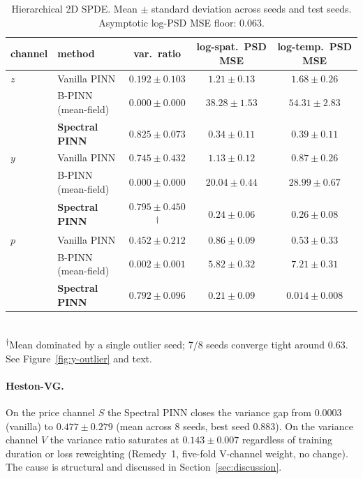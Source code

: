 \documentclass[review,12pt]{elsarticle}
\begin{document}
\begin{table}[h]
\centering
\caption{Hierarchical 2D SPDE. Mean \(\pm\) standard deviation
across seeds and test seeds. Asymptotic log-PSD MSE floor: 0.063.}
\label{tab:hier}
\begin{tabular}{l l c c c}
\toprule
channel & method & var.\ ratio & log-spat.\ PSD MSE & log-temp.\ PSD MSE \\
\midrule
\(z\) & Vanilla PINN          & \(0.192 \pm 0.103\) & \(1.21 \pm 0.13\) & \(1.68 \pm 0.26\) \\
      & B-PINN (mean-field)   & \(0.000 \pm 0.000\) & \(38.28 \pm 1.53\) & \(54.31 \pm 2.83\) \\
      & \textbf{Spectral PINN} & \(\mathbf{0.825 \pm 0.073}\) & \(\mathbf{0.34 \pm 0.11}\) & \(\mathbf{0.39 \pm 0.11}\) \\
\midrule
\(y\) & Vanilla PINN          & \(0.745 \pm 0.432\) & \(1.13 \pm 0.12\) & \(0.87 \pm 0.26\) \\
      & B-PINN (mean-field)   & \(0.000 \pm 0.000\) & \(20.04 \pm 0.44\) & \(28.99 \pm 0.67\) \\
      & \textbf{Spectral PINN} & \(0.795 \pm 0.450\)\textsuperscript{$\dagger$}
                                & \(\mathbf{0.24 \pm 0.06}\)
                                & \(\mathbf{0.26 \pm 0.08}\) \\
\midrule
\(p\) & Vanilla PINN          & \(0.452 \pm 0.212\) & \(0.86 \pm 0.09\) & \(0.53 \pm 0.33\) \\
      & B-PINN (mean-field)   & \(0.002 \pm 0.001\) & \(5.82 \pm 0.32\) & \(7.21 \pm 0.31\) \\
      & \textbf{Spectral PINN} & \(\mathbf{0.792 \pm 0.096}\)
                                & \(\mathbf{0.21 \pm 0.09}\)
                                & \(\mathbf{0.014 \pm 0.008}\) \\
\bottomrule
\end{tabular}\\[4pt]
\textsuperscript{$\dagger$}Mean dominated by a single outlier
seed; 7/8 seeds converge tight around $0.63$. See
Figure~\ref{fig:y-outlier} and text.
\end{table}

\paragraph{Heston-VG.}
On the price channel \(S\) the Spectral PINN closes the variance
gap from \(0.0003\) (vanilla) to \(0.477 \pm 0.279\) (mean across
8 seeds, best seed 0.883). On the variance channel \(V\) the
variance ratio saturates at \(0.143 \pm 0.007\) regardless of
training duration or loss reweighting (Remedy~1, five-fold
V-channel weight, no change). The cause is structural and
discussed in Section~\ref{sec:discussion}.
\end{document}
